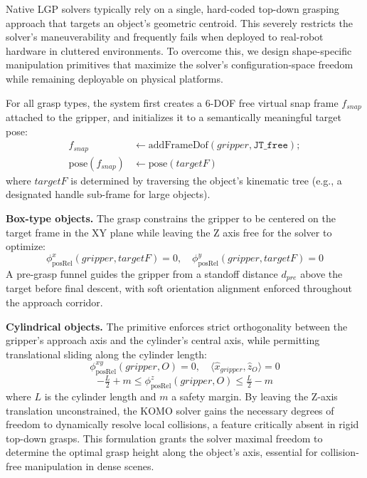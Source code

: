 \documentclass[journal]{IEEEtran}
\begin{document}
  Native LGP solvers typically rely on a single, hard-coded top-down grasping
  approach that targets an object's geometric centroid. This severely restricts the
  solver's maneuverability and frequently fails when deployed to real-robot
  hardware in cluttered environments. To overcome this, we design shape-specific
  manipulation primitives that maximize the solver's configuration-space freedom
  while remaining deployable on physical platforms.

  For all grasp types, the system first creates a 6-DOF free virtual snap frame
  $f_{snap}$ attached to the gripper, and initializes it to a semantically
  meaningful target pose:
  \begin{equation}
    \begin{split}
      f_{snap} &\leftarrow \text{addFrameDof}(gripper, \texttt{JT\_free}); \\
      \text{pose}(f_{snap}) &\leftarrow \text{pose}(targetF)
    \end{split}
    \label{eq:snap_frame}
  \end{equation}
  where $targetF$ is determined by traversing the object's kinematic tree (e.g., a
  designated handle sub-frame for large objects).

  \textbf{Box-type objects.}
  The grasp constrains the gripper to be centered on the target frame in the XY
  plane while leaving the Z axis free for the solver to optimize:
  \begin{equation}
    \phi_{\text{posRel}}^{x}(gripper, targetF) = 0, \quad
    \phi_{\text{posRel}}^{y}(gripper, targetF) = 0
    \label{eq:pick_box}
  \end{equation}
  A pre-grasp funnel guides the gripper from a standoff distance $d_{pre}$ above
  the target before final descent, with soft orientation alignment enforced
  throughout the approach corridor.

  \textbf{Cylindrical objects.}
  The primitive enforces strict orthogonality between the gripper's approach axis
  and the cylinder's central axis, while permitting translational sliding along
  the cylinder length:
  \begin{equation}
    \phi_{\text{posRel}}^{xy}(gripper, O) = 0, \quad
    \langle \hat{x}_{gripper}, \hat{z}_{O} \rangle = 0
    \label{eq:pick_cyl_axis}
  \end{equation}
  \begin{equation}
    -\tfrac{L}{2} + m \leq \phi_{\text{posRel}}^{z}(gripper, O)
    \leq \tfrac{L}{2} - m
    \label{eq:pick_cyl_slide}
  \end{equation}
  where $L$ is the cylinder length and $m$ a safety margin. By leaving the Z-axis translation unconstrained, the KOMO solver gains the necessary degrees of freedom to dynamically resolve local collisions, a feature critically absent in rigid top-down grasps. This formulation grants
  the solver maximal freedom to determine the optimal grasp height along the
  object's axis, essential for collision-free manipulation in dense scenes.
\end{document}
